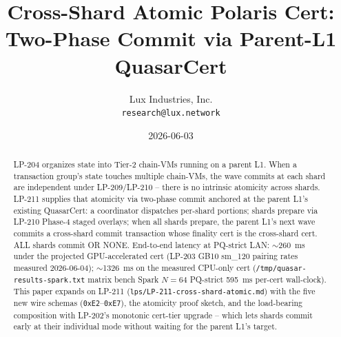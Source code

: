 \documentclass[11pt,a4paper]{article}
\title{Cross-Shard Atomic Polaris Cert:\\
       Two-Phase Commit via Parent-L1 QuasarCert}
\author{Lux Industries, Inc. \\
        \texttt{research@lux.network}}
\date{2026-06-03}
\begin{document}
\luxcoverpage

\begin{abstract}
LP-204 organizes state into Tier-2 chain-VMs running on a parent
L1. When a transaction group's state touches multiple chain-VMs, the
wave commits at each shard are independent under LP-209/LP-210 --
there is no intrinsic atomicity across shards. LP-211 supplies that
atomicity via two-phase commit anchored at the parent L1's existing
QuasarCert: a coordinator dispatches per-shard portions; shards
prepare via LP-210 Phase-4 staged overlays; when all shards prepare,
the parent L1's next wave commits a cross-shard commit transaction
whose finality cert is the cross-shard cert. ALL shards commit OR
NONE. End-to-end latency at PQ-strict LAN:
$\sim$\SI{260}{\milli\second} under the projected GPU-accelerated
cert (LP-203 GB10 sm\_120 pairing rates measured 2026-06-04);
$\sim$\SI{1326}{\milli\second} on the measured CPU-only cert
(\texttt{/tmp/quasar-results-spark.txt} matrix bench Spark
$N{=}64$ PQ-strict \SI{595}{\milli\second} per-cert wall-clock).
This paper expands on LP-211
(\texttt{lps/LP-211-cross-shard-atomic.md}) with the five new wire
schemas (\texttt{0xE2}--\texttt{0xE7}), the atomicity proof sketch,
and the load-bearing composition with LP-202's monotonic cert-tier
upgrade -- which lets shards commit early at their individual mode
without waiting for the parent L1's target.
\end{abstract}

\tableofcontents
\newpage










\end{document}
